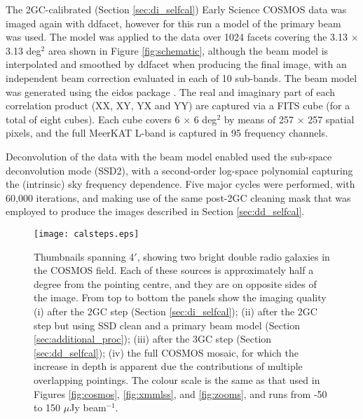 \documentclass[usenatbib,usedcolumn]{mnras}
\begin{document}
The 2GC-calibrated (Section \ref{sec:di_selfcal}) Early Science COSMOS data was imaged again with {\sc ddfacet}, however for this run a model of the primary beam was used. The model was applied to the data over 1024 facets covering the 3.13 $\times$ 3.13 deg$^{2}$ area shown in Figure \ref{fig:schematic}, although the beam model is interpolated and smoothed by {\sc ddfacet} when producing the final image, with an independent beam correction evaluated in each of 10 sub-bands. The beam model was generated using the {\sc eidos} package \citep{asad2021}. The real and imaginary part of each correlation product (XX, XY, YX and YY) are captured via a FITS cube (for a total of eight cubes). Each cube covers 6 $\times$ 6 deg$^{2}$ by means of 257 $\times$ 257 spatial pixels, and the full MeerKAT L-band is captured in 95 frequency channels. 

Deconvolution of the data with the beam model enabled used the sub-space deconvolution mode (SSD2), with a second-order log-space polynomial capturing the (intrinsic) sky frequency dependence. Five major cycles were performed, with 60,000 iterations, and making use of the same post-2GC cleaning mask that was employed to produce the images described in Section \ref{sec:dd_selfcal}. 

\begin{figure}
 \texttt{[image: calsteps.eps]}
 \caption{Thumbnails spanning 4$'$, showing two bright double radio galaxies in the COSMOS field. Each of these sources is approximately half a degree from the pointing centre, and they are on opposite sides of the image. From top to bottom the panels show the imaging quality (i) after the 2GC step (Section \ref{sec:di_selfcal}); (ii) after the 2GC step but using SSD clean and a primary beam model (Section \ref{sec:additional_proc}); (iii) after the 3GC step (Section \ref{sec:dd_selfcal}); (iv) the full COSMOS mosaic, for which the increase in depth is apparent due the contributions of multiple overlapping pointings. The colour scale is the same as that used in Figures \ref{fig:cosmos}, \ref{fig:xmmlss}, and \ref{fig:zooms}, and runs from -50 to 150 $\mu$Jy beam$^{-1}$.}
 \label{fig:calsteps}
\end{figure}
\end{document}
